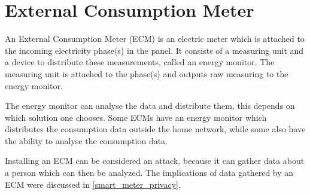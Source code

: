 \section{External Consumption Meter}\label{ecm}
An External Consumption Meter (ECM) is an electric meter which is attached to the incoming electricity phase(s) in the panel.
It consists of a measuring unit and a device to distribute these measurements, called an energy monitor.
The measuring unit is attached to the phase(s) and outputs raw measuring to the energy monitor.

The energy monitor can analyse the data and distribute them, this depends on which solution one chooses.
Some ECMs have an energy monitor which distributes the consumption data outside the home network, while some also have the ability to analyse the consumption data.\cite{TED,efergy,open_energy_monitor}

Installing an ECM can be considered an attack, because it can gather data about a person which can then be analyzed.
The implications of data gathered by an ECM were discussed in \cref{smart_meter_privacy}.
